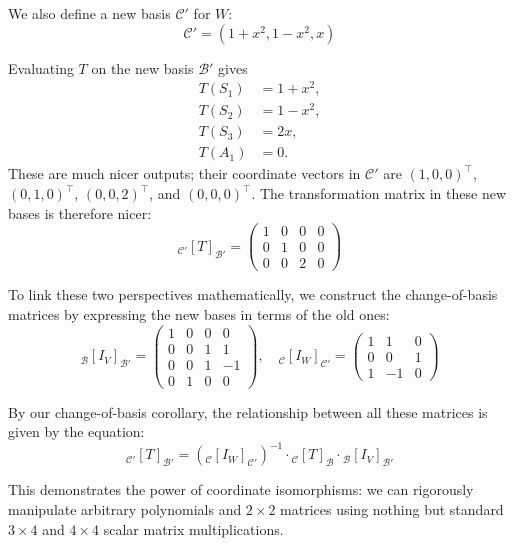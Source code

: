 \documentclass[../linear_algebra_and_groups.tex]{subfiles}
\begin{document}
\begin{example}
    We also define a new basis $\mathcal{C}'$ for $W$:
    \[ \mathcal{C}' = (1+x^2, 1-x^2, x) \]
    
    Evaluating $T$ on the new basis $\mathcal{B}'$ gives
    \begin{align*}
        T(S_1) &= 1+x^2, \\
        T(S_2) &= 1-x^2,\\
        T(S_3) &= 2x, \\
        T(A_1) &= 0.
    \end{align*}
    These are much nicer outputs; their coordinate vectors in $\mathcal{C}'$ are $(1,0,0)^\top$, $(0,1,0)^\top$, $(0,0,2)^\top$, and $(0,0,0)^\top$. The transformation matrix in these new bases is therefore nicer:
    \[ {}_{\mathcal{C}'}[T]_{\mathcal{B}'} = \begin{pmatrix} 1 & 0 & 0 & 0 \\ 0 & 1 & 0 & 0 \\ 0 & 0 & 2 & 0 \end{pmatrix} \]
    
    To link these two perspectives mathematically, we construct the change-of-basis matrices by expressing the new bases in terms of the old ones:
    \[ {}_\mathcal{B}[I_V]_{\mathcal{B}'} = \begin{pmatrix} 1 & 0 & 0 & 0 \\ 0 & 0 & 1 & 1 \\ 0 & 0 & 1 & -1 \\ 0 & 1 & 0 & 0 \end{pmatrix}, \quad {}_\mathcal{C}[I_W]_{\mathcal{C}'} = \begin{pmatrix} 1 & 1 & 0 \\ 0 & 0 & 1 \\ 1 & -1 & 0 \end{pmatrix} \]
    
    By our change-of-basis corollary, the relationship between all these matrices is given by the equation:
    \[ {}_{\mathcal{C}'}[T]_{\mathcal{B}'} = ({}_\mathcal{C}[I_W]_{\mathcal{C}'})^{-1} \cdot {}_\mathcal{C}[T]_\mathcal{B} \cdot {}_\mathcal{B}[I_V]_{\mathcal{B}'} \]
    
    This demonstrates the power of coordinate isomorphisms: we can rigorously manipulate arbitrary polynomials and $2\times 2$ matrices using nothing but standard $3\times 4$ and $4\times 4$ scalar matrix multiplications.
\end{example}
\end{document}
